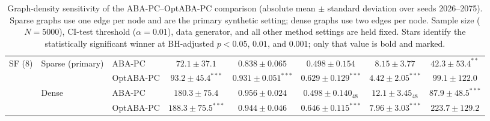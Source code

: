 \begin{table}[t]
{\begin{tabular}{lllccccc}
\addlinespace[2pt]
SF (8) & Sparse (primary) & ABA-PC & $72.1\pm37.1$ & $0.838\pm0.065$ & $0.498\pm0.154$ & $8.15\pm3.77$ & $\mathbf{42.3\pm53.4}^{**}$\\
 &  & OptABA-PC & $\mathbf{93.2\pm45.4}^{***}$ & $\mathbf{0.931\pm0.051}^{***}$ & $\mathbf{0.629\pm0.129}^{***}$ & $\mathbf{4.42\pm2.05}^{***}$ & $99.1\pm122.0$\\
 & Dense & ABA-PC & $180.3\pm75.4$ & $0.956\pm0.024$ & $0.498\pm0.140_{48}$ & $12.1\pm3.45_{48}$ & $\mathbf{87.9\pm48.5}^{***}$\\
 &  & OptABA-PC & $\mathbf{188.3\pm75.5}^{***}$ & $0.944\pm0.046$ & $\mathbf{0.646\pm0.115}^{***}$ & $\mathbf{7.96\pm3.03}^{***}$ & $223.7\pm129.2$\\
\bottomrule
\end{tabular}
}%
\caption{Graph-density sensitivity of the ABA-PC--OptABA-PC comparison (absolute mean $\pm$ standard deviation over seeds 2026--2075). Sparse graphs use one edge per node and are the primary synthetic setting; dense graphs use two edges per node. Sample size ($N=5000$), CI-test threshold ($\alpha=0.01$), data generator, and all other method settings are held fixed. Stars identify the statistically significant winner at BH-adjusted $p<0.05$, $0.01$, and $0.001$; only that value is bold and marked.}
\label{tab:repair-sensitivity}
\end{table}
